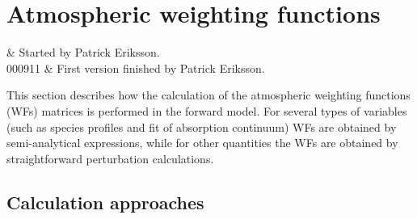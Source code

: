 %
%
\chapter{Atmospheric weighting functions}
 \label{sec:wfuns}


%
%
 & Started by Patrick Eriksson.\\
  000911 & First version finished by Patrick Eriksson.\\
\stophistory


%
%
%



%
%
This section describes how the calculation of the atmospheric weighting
functions (WFs) matrices is performed in the forward model. For
several types of variables (such as species profiles and fit of
absorption continuum) WFs are obtained by semi-analytical expressions,
while for other quantities the WFs are obtained by straightforward
perturbation calculations.



\section{Calculation approaches}
 \label{sec:wfuns:approaches}

